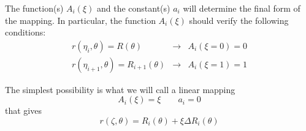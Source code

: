 The function(s) $A_i(\xi)$ and the constant(s) $a_i$ will determine the final form of the mapping. In particular,
the function $A_i(\xi)$ should verify the following conditions:
\begin{eqnarray*}
r(\eta_i,\theta)=R(\theta) &\longrightarrow& A_i(\xi=0)=0\\
r(\eta_{i+1},\theta)=R_{i+1}(\theta) &\longrightarrow& A_i(\xi=1)=1
\end{eqnarray*}

The simplest possibility is what we will call a linear mapping
\begin{equation}
A_i(\xi)=\xi \qquad a_i=0
\end{equation}
that gives
\begin{equation}
\label{eq:map_linear}
r(\zeta,\theta)=R_i(\theta)+\xi\Delta R_i(\theta)
\end{equation}

